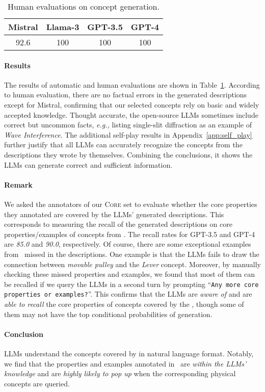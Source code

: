 \begin{table}[t!]
    \small
    \centering
    \begin{tabular}{cccc}
    \toprule
      \bf Mistral & \bf Llama-3 & \bf GPT-3.5 & \bf GPT-4 \\
     \midrule
    92.6& 100 &100 & 100\\
    \bottomrule
    \end{tabular}
    \vspace{-0.1in}
    \caption{Human evaluations on concept generation.}
    \vspace{-0.2in}
    \label{tab:generation}
\end{table}

\paragraph{Results}
The results of automatic and human evaluations are shown in Table~\ref{tab:generation}. 
According to human evaluation, there are no factual errors in the generated descriptions except for Mistral,
confirming that our selected concepts rely on basic and widely accepted knowledge.
Thought accurate, the open-source LLMs sometimes include correct but uncommon facts, \emph{e.g.,} listing single-slit diffraction as an example of \emph{Wave Interference}.
The additional self-play results in Appendix~\ref{app:self_play} further justify that all LLMs can accurately recognize the concepts from the descriptions they wrote by themselves.
Combining the conclusions, 
it shows the LLMs can generate correct and sufficient information.

\paragraph{Remark} We asked the annotators of our \textsc{Core} set to evaluate whether the core properties they annotated are covered by the LLMs' generated descriptions.
This corresponds to measuring the recall of the generated descriptions on core properties/examples of concepts from \coredatasetns. The recall rates for GPT-3.5 and GPT-4 are \emph{85.0} and \emph{90.0}, respectively. 
Of course, there are some exceptional examples from \coredatasetns\ missed in the descriptions. One example is that the LLMs fails to draw the connection between \emph{movable pulley} and the \emph{Lever} concept. Moreover, by manually checking these missed properties and examples, we found that most of them can be recalled if we query the LLMs in a second turn by prompting ``{\small \texttt{Any more core properties or examples?}}''. This confirms that the LLMs are \emph{aware of} and are \emph{able to recall} the core properties of concepts covered by the \coredatasetns, though some of them may not have the top conditional probabilities of generation.


\paragraph{Conclusion} LLMs understand the concepts covered by \datasetname in natural language format.
Notably, we find that the {properties and examples annotated in \coredatasetns\ are \emph{within the LLMs' knowledge} and are \emph{highly likely to pop up} when the corresponding physical concepts are queried}.
